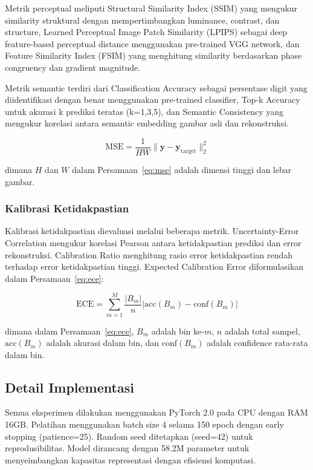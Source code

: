 Metrik perceptual meliputi Structural Similarity Index (SSIM) yang mengukur similarity struktural dengan mempertimbangkan luminance, contrast, dan structure, Learned Perceptual Image Patch Similarity (LPIPS) sebagai deep feature-based perceptual distance menggunakan pre-trained VGG network, dan Feature Similarity Index (FSIM) yang menghitung similarity berdasarkan phase congruency dan gradient magnitude.

Metrik semantic terdiri dari Classification Accuracy sebagai persentase digit yang diidentifikasi dengan benar menggunakan pre-trained classifier, Top-k Accuracy untuk akurasi k prediksi teratas (k=1,3,5), dan Semantic Consistency yang mengukur korelasi antara semantic embedding gambar asli dan rekonstruksi.

\begin{equation}
\text{MSE} = \frac{1}{HW}\|\mathbf{y} - \mathbf{y}_{\text{target}}\|_2^2
\label{eq:mse}
\end{equation}

dimana $H$ dan $W$ dalam Persamaan~\ref{eq:mse} adalah dimensi tinggi dan lebar gambar.

\subsubsection{Kalibrasi Ketidakpastian}
Kalibrasi ketidakpastian dievaluasi melalui beberapa metrik. Uncertainty-Error Correlation mengukur korelasi Pearson antara ketidakpastian prediksi dan error rekonstruksi. Calibration Ratio menghitung rasio error ketidakpastian rendah terhadap error ketidakpastian tinggi. Expected Calibration Error diformulasikan dalam Persamaan~\ref{eq:ece}:

\begin{equation}
\text{ECE} = \sum_{m=1}^M \frac{|B_m|}{n}|\text{acc}(B_m) - \text{conf}(B_m)|
\label{eq:ece}
\end{equation}

dimana dalam Persamaan~\ref{eq:ece}, $B_m$ adalah bin ke-$m$, $n$ adalah total sampel, $\text{acc}(B_m)$ adalah akurasi dalam bin, dan $\text{conf}(B_m)$ adalah confidence rata-rata dalam bin.

\subsection{Detail Implementasi}

Semua eksperimen dilakukan menggunakan PyTorch 2.0 pada CPU dengan RAM 16GB. Pelatihan menggunakan batch size 4 selama 150 epoch dengan early stopping (patience=25). Random seed ditetapkan (seed=42) untuk reprodusibilitas. Model dirancang dengan 58.2M parameter untuk menyeimbangkan kapasitas representasi dengan efisiensi komputasi.

